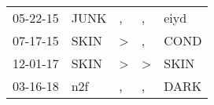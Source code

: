 \begin{supertabular}{p{0.07\textwidth}p{0.06\textwidth}p{0.02\textwidth}p{0.02\textwidth}p{0.06\textwidth}}
 05-22-15\textsuperscript{} &  JUNK\textsuperscript{} &             , &             , &  eiyd\textsuperscript{} \\
 07-17-15\textsuperscript{} &  SKIN\textsuperscript{} &  \textgreater &             , &  COND\textsuperscript{} \\
 12-01-17\textsuperscript{} &  SKIN\textsuperscript{} &  \textgreater &  \textgreater &  SKIN\textsuperscript{} \\
 03-16-18\textsuperscript{} &   n2f\textsuperscript{} &             , &             , &  DARK\textsuperscript{} \\
\end{supertabular}
